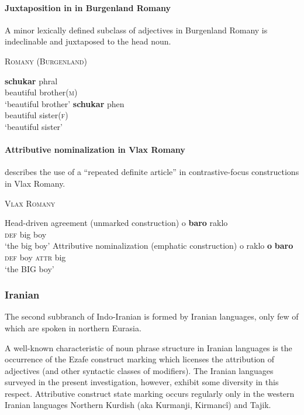 \paragraph{Juxtaposition in in Burgenland Romany}
A minor lexically defined subclass of adjectives in Burgenland Romany is indeclinable and juxtaposed to the head noun.
\begin{exe}
\ex \textsc{Romany (Burgenland)} \citep[22–23]{halwachs-etal2002}
\begin{xlist}
\ex 
\gll	\textbf{schukar} phral\\
	beautiful brother(\textsc{m})\\
\glt	‘beautiful brother’
\ex
\gll	\textbf{schukar} phen\\
	beautiful sister(\textsc{f})\\
\glt	‘beautiful sister’
\end{xlist}
\end{exe}

\paragraph{Attributive nominalization in Vlax Romany}
\citet{hancock1995} describes the use of a “repeated definite article” in contrastive-focus constructions in Vlax Romany. 
\begin{exe}
\ex \textsc{Vlax Romany} \citep[30]{hancock1995}
\begin{xlist}
\ex Head-driven agreement (unmarked construction)
\gll	o \textbf{baro} raklo\\
	\textsc{def}	big	boy\\
\glt ‘the big boy’
\ex Attributive nominalization (emphatic construction)
\gll	o raklo \textbf{o} \textbf{baro}\\
	\textsc{def}	{boy}	\textsc{attr} big\\
\glt	‘the BIG boy’
\end{xlist}
\end{exe}

\subsubsection{Iranian}\label{iranian synchr}
The second subbranch of Indo-Iranian is formed by Iranian languages, only few of which are spoken in northern Eurasia.

A well-known characteristic of noun phrase structure in Iranian languages is the occurrence of the Ezafe construct marking which licenses the attribution of adjectives (and other syntactic classes of modifiers). The Iranian languages surveyed in the present investigation, however, exhibit some diversity in this respect. Attributive construct state marking occurs regularly only in the western Iranian languages Northern Kurdish (aka Kurmanji, Kirmancî) and Tajik.

